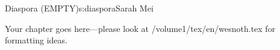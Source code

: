 \begin{aosachapter}{Diaspora (EMPTY)}{s:diaspora}{Sarah Mei}

Your chapter goes here---please look at /volume1/tex/en/wesnoth.tex for 
formatting ideas.

\end{aosachapter}
